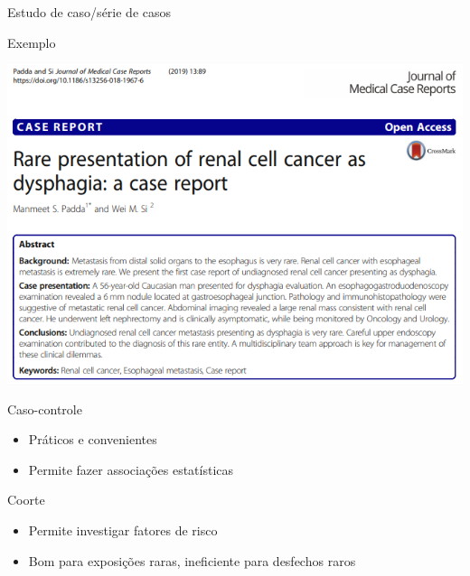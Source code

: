\documentclass{beamer}
\begin{document}
\begin{frame}{Estudo de caso/série de casos}
  \begin{exampleblock}{Exemplo}
    \begin{center}
      \includegraphics[width=.9\textwidth]{Metodos/exemplo-casereport}
    \end{center}
  \end{exampleblock}
\end{frame}

\begin{frame}{Caso-controle}
  \begin{itemize}
    \small
  \item Práticos e convenientes
    \bigskip
  \item Permite fazer associações estatísticas
  \end{itemize}
\end{frame}

\begin{frame}{Coorte}
  \begin{itemize}
    \small
  \item Permite investigar fatores de risco
    \bigskip
  \item Bom para exposições raras, ineficiente para desfechos raros
  \end{itemize}
\end{frame}
\end{document}
